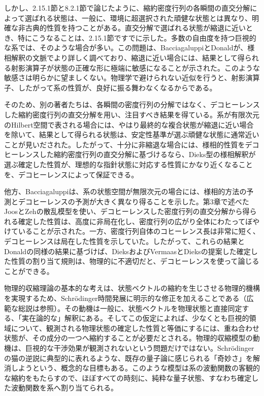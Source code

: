 しかし、2.15.1節と8.2.1節で論じたように、縮約密度行列の各瞬間の直交分解によって選ばれる状態は、一般に、環境に超選択された頑健な状態とは異なり、明確な非古典的性質を持つことがある。直交分解で選ばれる状態が縮退に近いとき、特にこうなることは、2.15.1節ですでに示した。多数の自由度を持つ巨視的な系では、そのような場合が多い。この問題は、Bacciagaluppi\cite{ref439}とDonald\cite{ref440}が、様相解釈の文脈でより詳しく調べており、縮退に近い場合には、結果として得られる射影演算子が状態の正確な形に極端に敏感になることが示された\cite{ref439}。このような敏感さは明らかに望ましくない。物理学で避けられない近似を行うと、射影演算子、したがって系の性質が、良好に振る舞わなくなるからである\cite{ref440}。

そのため、別の著者たちは、各瞬間の密度行列の分解ではなく、デコヒーレンスした縮約密度行列の直交分解を用い、注目すべき結果を得ている。系が有限次元のHilbert空間で表される場合には、やはり最終的な複合状態が縮退に近い場合を除いて、結果として得られる状態は、安定性基準が選ぶ頑健な状態に通常近いことが見いだされた\cite{ref441,ref442}。したがって、十分に非縮退な場合には、様相的性質をデコヒーレンスした縮約密度行列の直交分解に基づけるなら、Dieks型の様相解釈が選ぶ確定した性質が、理想的な指針状態に対応する性質にかなり近くなることを、デコヒーレンスによって保証できる。

他方、Bacciagaluppi\cite{ref443}は、系の状態空間が無限次元の場合には、様相的方法\cite{ref436,ref437}の予測とデコヒーレンスの予測が大きく異なり得ることを示した。第3章で述べたJoosとZehの散乱模型\cite{ref007}を使い、デコヒーレンスした密度行列の直交分解から得られる確定した性質は、高度に非局在化し、密度行列の広がり全体にわたってぼやけていることが示された。一方、密度行列自体のコヒーレンス長は非常に短く、デコヒーレンスは局在した性質を示していた。したがって、これらの結果とDonald\cite{ref440}の同様の結果に基づけば、Dieks\cite{ref436}およびVermaasとDieks\cite{ref437}の提案した確定した性質の割り当て規則は、物理的に不適切だと、デコヒーレンスを使って論じることができる。


\hypertarget{srcpage:348}{}\label{srcpage:348}
物理的収縮理論の基本的な考えは、状態ベクトルの縮約を生じさせる物理的機構を実現するため、Schrödinger時間発展に明示的な修正を加えることである（広範な総説は\cite{ref444}参照）。その動機は一般に、状態ベクトルを物理状態と直接同定する、「実在論的な」解釈にある。そしてこの仮定によれば、少なくとも巨視的領域について、観測される物理状態の確定した性質と等価にするには、重ね合わせ状態が、その成分の一つへ縮約することが必要だとされる。物理的収縮模型の動機は、巨視的な干渉効果が観測されないという問題だけではない。Schrödingerの猫の逆説に典型的に表れるような、既存の量子論に感じられる「奇妙さ」\cite{ref445}を解消しようという、概念的な目標もある。このような模型は系の波動関数の客観的な縮約をもたらすので、ほぼすべての時刻に、純粋な量子状態、すなわち確定した波動関数を系へ割り当てられる。

